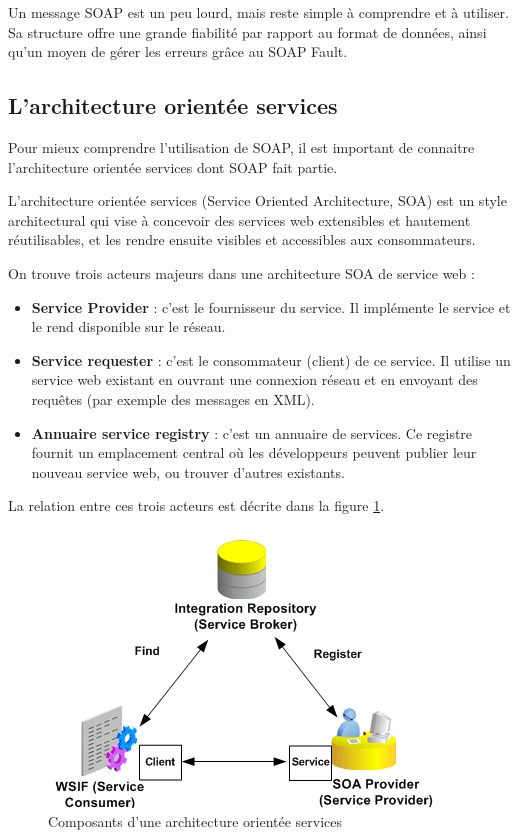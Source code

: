Un message SOAP est un peu lourd, mais reste simple à comprendre et à utiliser. Sa structure offre une grande fiabilité par rapport au format de données, ainsi qu'un moyen de gérer les erreurs grâce au SOAP Fault.

\subsection{L'architecture orientée services}
Pour mieux comprendre l'utilisation de SOAP, il est important de connaitre l'architecture orientée services dont SOAP fait partie.

L'architecture orientée services (Service Oriented Architecture, SOA) est un style architectural qui vise à concevoir des services web extensibles et hautement réutilisables, et les rendre ensuite visibles et accessibles aux consommateurs.
				
On trouve trois acteurs majeurs dans une architecture SOA de service web :
\begin{itemize}
	\item \textbf{Service Provider} : 
	      c'est le fournisseur du service. Il implémente le service et le rend disponible sur le réseau.
	\item \textbf{Service requester} :
	      c'est le consommateur (client) de ce service. Il utilise un service web existant en ouvrant une connexion réseau et en envoyant des requêtes (par exemple des messages en XML).
	\item \textbf{Annuaire service registry} : 
	      c'est un annuaire de services. Ce registre fournit un emplacement central où les développeurs peuvent publier leur nouveau service web, ou trouver d'autres existants.\newline 
\end{itemize}
La relation entre ces trois acteurs est décrite dans la figure \ref{fig:SOA}.
\begin{figure}[h]
	\center
	\includegraphics[scale=0.71]{img/SOA.png}
	\caption{Composants d'une architecture orientée services}
	\label{fig:SOA}
	\centering
\end{figure}		


